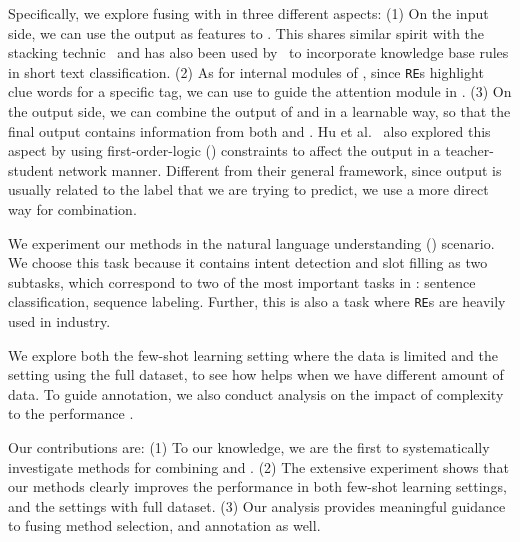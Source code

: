 


Specifically, we explore fusing \RE with \NN in three different aspects:
(1) On the \NN input side, we can use the \RE output as features to \NN. 
This shares similar spirit with the stacking technic~\cite{wolpert1992stacked} and has also been used by~\cite{wangcombining17} to incorporate knowledge base rules in short text classification. 
(2) As for internal modules of \NN, since \texttt{RE}s highlight clue words for a specific tag, we can use \RE to guide the attention module in \NN.
(3) On the \NN output side, we can combine the output of \RE and \NN in a learnable way, so that the final output contains information from both \NN and \RE. 
Hu et al.~ also explored this aspect by using first-order-logic (\FOL) constraints to affect the \NN output in a teacher-student network manner.
Different from their general framework, since \RE output is usually related to the label that we are trying to predict, we use a more direct way for combination. 

We experiment our methods in the natural language understanding (\NLU) scenario.
We choose this task because it contains intent detection and slot filling as two subtasks, which correspond to two of the most important tasks in \NLP: sentence classification, sequence labeling. Further, this is also a task where \texttt{RE}s are heavily used in industry.

We explore both the few-shot learning setting where the data is limited and the setting using the full dataset, to see how \RE helps when we have different amount of data. 
To guide \RE annotation, we also conduct analysis on the impact of \RE complexity to the performance \NN. 

Our contributions are: (1) To our knowledge, we are the first to systematically investigate methods for combining \RE and \NN. (2) The extensive experiment shows that our methods clearly improves the \NN performance in both few-shot learning settings, and the settings with full dataset. (3) Our analysis provides meaningful guidance to fusing method selection, and \RE annotation as well.

